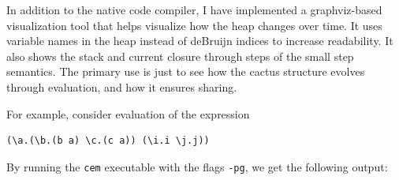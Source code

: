 In addition to the native code compiler, I have implemented a graphviz-based
visualization tool that helps visualize how the heap changes over time. It uses
variable names in the heap instead of deBruijn indices to increase readability.
It also shows the stack and current closure through steps of the small step \ce
semantics. The primary use is just to see how the cactus structure evolves
through evaluation, and how it ensures sharing. 

For example, consider evaluation of the expression

\begin{verbatim}
(\a.(\b.(b a) \c.(c a)) (\i.i \j.j))
\end{verbatim}

By running the \texttt{cem} executable with the flags \texttt{-pg}, we get the
following output: 

